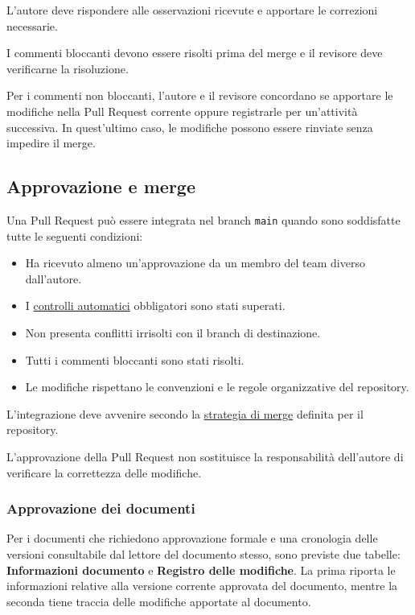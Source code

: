 \documentclass[11pt, a4paper]{article}
\begin{document}
\noindent L'autore deve rispondere alle osservazioni ricevute e apportare le correzioni necessarie.

I commenti bloccanti devono essere risolti prima del merge e il revisore deve verificarne la risoluzione.

Per i commenti non bloccanti, l'autore e il revisore concordano se apportare le modifiche nella Pull Request corrente oppure registrarle per un'attività successiva. In quest'ultimo caso, le modifiche possono essere rinviate senza impedire il merge.

\subsection{Approvazione e merge}
\label{subsec:approvazione-e-merge}

Una Pull Request può essere integrata nel branch \texttt{main} quando sono soddisfatte tutte le seguenti condizioni:
\begin{itemize}
    \item Ha ricevuto almeno un'approvazione da un membro del team diverso dall'autore.
    \item I \href{https://github.com/On-By-One-Team/On-By-One.github.io/tree/main/.github/workflows}{controlli automatici} obbligatori sono stati superati.
    \item Non presenta conflitti irrisolti con il branch di destinazione.
    \item Tutti i commenti bloccanti sono stati risolti.
    \item Le modifiche rispettano le convenzioni e le regole organizzative del repository.
\end{itemize}

\noindent L'integrazione deve avvenire secondo la \hyperref[subsec:pull-request-e-merge]{strategia di merge} definita per il repository.

L'approvazione della Pull Request non sostituisce la responsabilità dell'autore di verificare la correttezza delle modifiche.

\subsubsection{Approvazione dei documenti}

Per i documenti che richiedono approvazione formale e una cronologia delle versioni consultabile dal lettore del documento stesso, sono previste due tabelle: \textbf{Informazioni documento} e \textbf{Registro delle modifiche}. La prima riporta le informazioni relative alla versione corrente approvata del documento, mentre la seconda tiene traccia delle modifiche apportate al documento.
\end{document}
